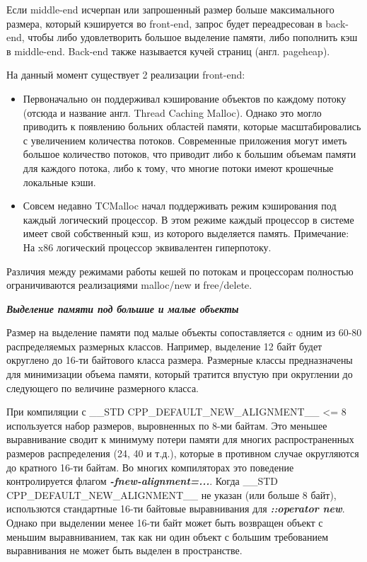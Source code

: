 Если middle-end исчерпан или запрошенный размер больше максимального размера, который кэшируется во front-end, запрос будет переадресован в back-end, чтобы либо удовлетворить большое выделение памяти, либо пополнить кэш в middle-end. Back-end также называется кучей страниц (англ. pageheap).

На данный момент существует 2 реализации front-end:
\begin{itemize}
	\item Первоначально он поддерживал кэширование объектов по каждому потоку (отсюда и название англ. Thread Caching Malloc). Однако это могло приводить к появлению больних областей памяти, которые масштабировались с увеличением количества потоков. Современные приложения могут иметь большое количество потоков, что приводит либо к большим объемам памяти для каждого потока, либо к тому, что многие потоки имеют крошечные локальные кэши.
	\item Совсем недавно TCMalloc начал поддерживать режим кэширования под каждый логический процессор. В этом режиме каждый процессор в системе имеет свой собственный кэш, из которого выделяется память. Примечание: На x86 логический процессор эквивалентен гиперпотоку.
\end{itemize}

Различия между режимами работы кешей по потокам и процессорам полностью ограничиваются реализациями malloc/new и free/delete.

\textit{\textbf{Выделение памяти под большие и малые объекты}}

Размер на выделение памяти под малые объекты сопоставляется c одним из 60-80 распределяемых размерных классов. Например, выделение 12 байт будет округлено до 16-ти байтового класса размера. Размерные классы предназначены для минимизации объема памяти, который тратится впустую при округлении до следующего по величине размерного класса.

При компиляции с  \_\_STD CPP\_DEFAULT\_NEW\_ALIGNMENT\_\_ <= 8 используется набор размеров, выровненных по 8-ми байтам. Это меньшее выравнивание сводит к минимуму потери памяти для многих распространенных размеров распределения (24, 40 и т.д.), которые в противном случае округляются до кратного 16-ти байтам. Во многих компиляторах это поведение контролируется флагом \textbf{\textit{-fnew-alignment=...}}. Когда \_\_STD CPP\_DEFAULT\_NEW\_ALIGNMENT\_\_ не указан (или больше 8 байт), использются стандартные 16-ти байтовые выравнивания для \textit{\textbf{::operator new}}. Однако при выделении менее 16-ти байт может быть возвращен объект с меньшим выравниванием, так как ни один объект с большим требованием выравнивания не может быть выделен в пространстве.

